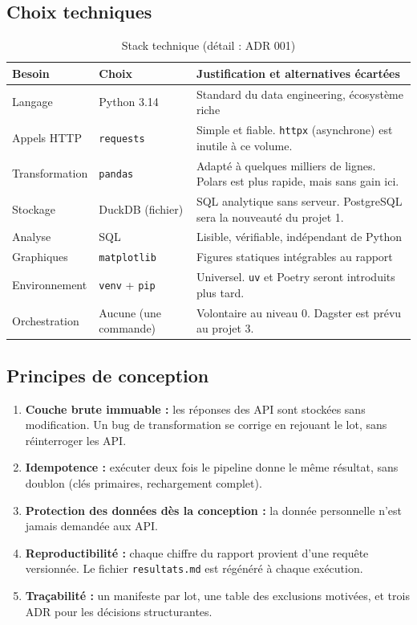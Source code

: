 \documentclass[11pt, a4paper, oneside, headings=normal, numbers=noenddot, DIV=12]{scrartcl}
\begin{document}
\subsection{Choix techniques}
\begin{table}[H]
\centering\small
\begin{tabularx}{\linewidth}{@{}L{2.5cm} L{3.4cm} Y@{}}
\toprule
\textbf{Besoin} & \textbf{Choix} & \textbf{Justification et alternatives écartées} \\
\midrule
Langage & Python 3.14 & Standard du data engineering, écosystème riche \\
Appels HTTP & \texttt{requests} & Simple et fiable. \texttt{httpx} (asynchrone) est inutile à ce volume. \\
Transformation & \texttt{pandas} & Adapté à quelques milliers de lignes. Polars est plus rapide, mais sans gain ici. \\
Stockage & DuckDB (fichier) & SQL analytique sans serveur. PostgreSQL sera la nouveauté du projet 1. \\
Analyse & SQL & Lisible, vérifiable, indépendant de Python \\
Graphiques & \texttt{matplotlib} & Figures statiques intégrables au rapport \\
Environnement & \texttt{venv} + \texttt{pip} & Universel. \texttt{uv} et Poetry seront introduits plus tard. \\
Orchestration & Aucune (une commande) & Volontaire au niveau 0. Dagster est prévu au projet 3. \\
\bottomrule
\end{tabularx}
\caption{Stack technique (détail : ADR 001)}
\end{table}

\subsection{Principes de conception}
\begin{enumerate}[leftmargin=1.4em]
  \item \textbf{Couche brute immuable :} les réponses des API sont stockées sans modification. Un bug de transformation se corrige en
        rejouant le lot, sans réinterroger les API.
  \item \textbf{Idempotence :} exécuter deux fois le pipeline donne le même résultat, sans doublon (clés primaires, rechargement complet).
  \item \textbf{Protection des données dès la conception :} la donnée personnelle n'est jamais demandée aux API.
  \item \textbf{Reproductibilité :} chaque chiffre du rapport provient d'une requête versionnée. Le fichier \texttt{resultats.md} est régénéré à chaque exécution.
  \item \textbf{Traçabilité :} un manifeste par lot, une table des exclusions motivées, et trois ADR pour les décisions structurantes.
\end{enumerate}
\end{document}
